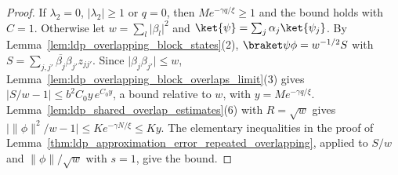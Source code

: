 \begin{proof}
    \leanok
    If $\lambda_2=0$, $\lvert\lambda_2\rvert\geq1$ or $q=0$, then
    $Me^{-\gamma q/\xi}\geq1$ and
    the bound holds with $C=1$. Otherwise let $w=\sum_l\lvert\beta_l\rvert^2$
    and $\ket{\psi}=\sum_j\alpha_j\ket{\psi_j}$. By
    Lemma~\ref{lem:ldp_overlapping_block_states}(2),
    $\braket\psi\phi=w^{-1/2}S$ with
    $S=\sum_{j,j'}\overline{\beta_j}\beta_{j'}z_{jj'}$. Since
    $\lvert\beta_j\beta_{j'}\rvert\leq w$,
    Lemma~\ref{lem:ldp_overlapping_block_overlaps_limit}(3) gives
    $\lvert S/w-1\rvert\leq b^2C_0y\,e^{C_0y}$, a bound relative to $w$, with
    $y=Me^{-\gamma q/\xi}$.
    Lemma~\ref{lem:ldp_shared_overlap_estimates}(6) with $R=\sqrt w$ gives
    $\lvert\lVert\phi\rVert^2/w-1\rvert\leq Ke^{-\gamma N/\xi}\leq Ky$. The
    elementary inequalities in the proof of
    Lemma~\ref{thm:ldp_approximation_error_repeated_overlapping}, applied to
    $S/w$ and $\lVert\phi\rVert/\sqrt w$ with $s=1$, give the bound.
\end{proof}

